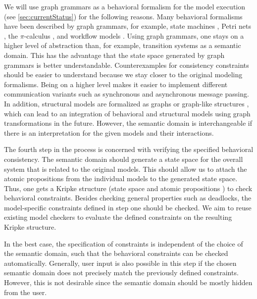 \documentclass[conference]{IEEEtran}
\begin{document}
We will use graph grammars as a behavioral formalism for the model execution (see \autoref{sec:currentStatus}) for the following reasons.
Many behavioral formalisms have been described by graph grammars, for example, state machines \cite{kuskeFormalSemanticsUML2001, varroFormalSemanticsUML2002}, Petri nets \cite{ehrigGraphGrammarsPetri2004}, the $\pi$-calculus \cite{gadducciGraphRewritingPcalculus2007}, and workflow models \cite{rutleMetamodellingApproachBehavioural2012}.
Using graph grammars, one stays on a higher level of abstraction than, for example, transition systems as a semantic domain.
This has the advantage that the state space generated by graph grammars is better understandable.
Counterexamples for consistency constraints should be easier to understand because we stay closer to the original modeling formalisms.
Being on a higher level makes it easier to implement different communication variants such as synchronous and asynchronous message passing.
In addition, structural models are formalized as graphs or graph-like structures \cite{stunkelMultipleModelSynchronization2020}, which can lead to an integration of behavioral and structural models using graph transformations in the future. 
However, the semantic domain is interchangeable if there is an interpretation for the given models and their interactions.

The fourth step in the process is concerned with verifying the specified behavioral consistency.
The semantic domain should generate a state space for the overall system that is related to the original models.
This should allow us to attach the atomic propositions from the individual models to the generated state space.
Thus, one gets a Kripke structure (state space and atomic propositions \cite{clarkeHandbookModelChecking2018}) to check behavioral constraints.
Besides checking general properties such as deadlocks, the model-specific constraints defined in step one should be checked.
We aim to reuse existing model checkers to evaluate the defined constraints on the resulting Kripke structure.

In the best case, the specification of constraints is independent of the choice of the semantic domain, such that the behavioral constraints can be checked automatically.
Generally, user input is also possible in this step if the chosen semantic domain does not precisely match the previously defined constraints.
However, this is not desirable since the semantic domain should be mostly hidden from the user.
\end{document}
